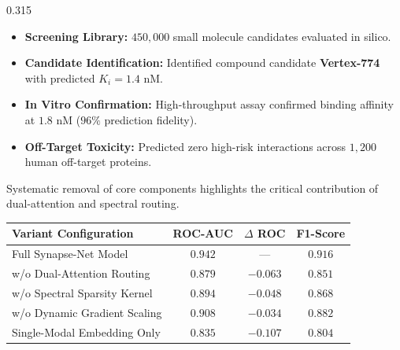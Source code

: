 \documentclass[final]{beamer}
\begin{document}
\begin{frame}[t]
\begin{columns}[t]
\begin{column}{0.315\textwidth}
\begin{tcolorbox}[accentblock, title=\faFile\ Case Study: Vertex-774 Drug Discovery]
      \vspace{6pt}
      \begin{itemize}
        \item \textbf{Screening Library:} $450,000$ small molecule candidates evaluated in silico.
        \item \textbf{Candidate Identification:} Identified compound candidate \textbf{Vertex-774} with predicted $K_i = 1.4\text{ nM}$.
        \item \textbf{In Vitro Confirmation:} High-throughput assay confirmed binding affinity at $1.8\text{ nM}$ ($96\%$ prediction fidelity).
        \item \textbf{Off-Target Toxicity:} Predicted zero high-risk interactions across $1,200$ human off-target proteins.
      \end{itemize}
    \end{tcolorbox}

    \vspace{14pt}

    \begin{tcolorbox}[posterblock, title=\faLock\ Architectural Ablation Study]
      \large
      Systematic removal of core components highlights the critical contribution of dual-attention and spectral routing.

      \vspace{8pt}
      \centering
      \small
      \begin{tabular}{lccc}
        \toprule
        \textbf{Variant Configuration} & \textbf{ROC-AUC} & \textbf{$\Delta$ ROC} & \textbf{F1-Score} \\
        \midrule
        Full Synapse-Net Model & $\mathbf{0.942}$ & --- & $\mathbf{0.916}$ \\{}
        w/o Dual-Attention Routing & $0.879$ & $-0.063$ & $0.851$ \\{}
        w/o Spectral Sparsity Kernel & $0.894$ & $-0.048$ & $0.868$ \\{}
        w/o Dynamic Gradient Scaling & $0.908$ & $-0.034$ & $0.882$ \\{}
        Single-Modal Embedding Only & $0.835$ & $-0.107$ & $0.804$ \\
        \bottomrule
      \end{tabular}
      \vspace{6pt}
    \end{tcolorbox}

    \vspace{14pt}


\end{column}
\end{columns}
\end{frame}
\end{document}
